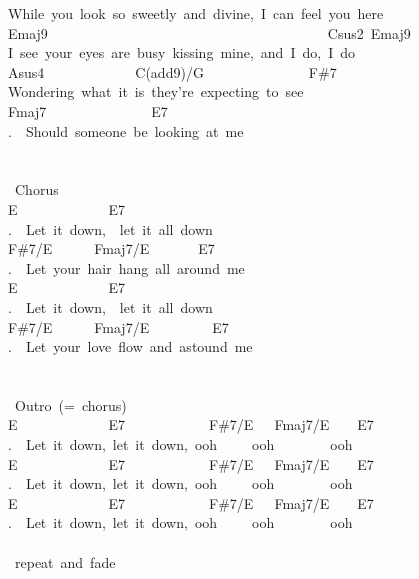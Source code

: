 {While\ you\ look\ so\ sweetly\ and\ divine,\ I\ can\ feel\ you\ here\\
Emaj9\ \ \ \ \ \ \ \ \ \ \ \ \ \ \ \ \ \ \ \ \ \ \ \ \ \ \ \ \ \ \ \ \ \ \ \ \ \ \ \ Csus2\ Emaj9\\
I\ see\ your\ eyes\ are\ busy\ kissing\ mine,\ and\ I\ do,\ I\ do\\
Asus4\ \ \ \ \ \ \ \ \ \ \ \ \ C(add9)/G\ \ \ \ \ \ \ \ \ \ \ \ \ \ \ F\#7\\
Wondering\ what\ it\ is\ they're\ expecting\ to\ see\\
Fmaj7\ \ \ \ \ \ \ \ \ \ \ \ \ \ \ E7\\
.\ \ Should\ someone\ be\ looking\ at\ me\\
\\
\\
\lbrack\ Chorus\rbrack\\
E\ \ \ \ \ \ \ \ \ \ \ \ \ E7\ \\
.\ \ Let\ it\ down,\ \ let\ it\ all\ down\\
F\#7/E\ \ \ \ \ \ Fmaj7/E\ \ \ \ \ \ \ E7\\
.\ \ Let\ your\ hair\ hang\ all\ around\ me\\
E\ \ \ \ \ \ \ \ \ \ \ \ \ E7\ \\
.\ \ Let\ it\ down,\ \ let\ it\ all\ down\\
F\#7/E\ \ \ \ \ \ Fmaj7/E\ \ \ \ \ \ \ \ \ E7\\
.\ \ Let\ your\ love\ flow\ and\ astound\ me\\
\\
\\
\lbrack\ Outro\rbrack\ (=\ chorus)\\
E\ \ \ \ \ \ \ \ \ \ \ \ \ E7\ \ \ \ \ \ \ \ \ \ \ \ F\#7/E\ \ \ Fmaj7/E\ \ \ \ E7\\
.\ \ Let\ it\ down,\ let\ it\ down,\ ooh\ \ \ \ \ ooh\ \ \ \ \ \ \ \ ooh\\
E\ \ \ \ \ \ \ \ \ \ \ \ \ E7\ \ \ \ \ \ \ \ \ \ \ \ F\#7/E\ \ \ Fmaj7/E\ \ \ \ E7\\
.\ \ Let\ it\ down,\ let\ it\ down,\ ooh\ \ \ \ \ ooh\ \ \ \ \ \ \ \ ooh\\
E\ \ \ \ \ \ \ \ \ \ \ \ \ E7\ \ \ \ \ \ \ \ \ \ \ \ F\#7/E\ \ \ Fmaj7/E\ \ \ \ E7\\
.\ \ Let\ it\ down,\ let\ it\ down,\ ooh\ \ \ \ \ ooh\ \ \ \ \ \ \ \ ooh\\
\\
\lbrack\ repeat\ and\ fade\rbrack}
